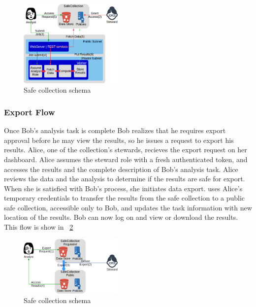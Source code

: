 \begin{figure}
  \center
  \includegraphics[width=0.45\textwidth]{figures/safe_flow.png}
  \caption{Safe collection schema}
  \label{fig:flow1}
  \vspace{-1.5em}
\end{figure}


\subsubsection{Export Flow}

Once Bob's analysis task is complete Bob realizes that he requires export approval before he may view the
results, so he issues a request to export his results. Alice, one of the collection's stewards, recieves
the export request on her dashboard. Alice assumes
the steward role with a fresh authenticated token, and accesses the results and the complete description
of Bob's analysis task. Alice reviews the data and the analysis to determine if the results are
safe for export. When she is satisfied with Bob's process, she initiates data export. \NAME
uses Alice's temporary credentials to transfer the results from the safe collection to a public
safe collection, accessible only to Bob, and updates the task information with new location of the results. Bob can now log on
and view or download the results. This flow is show in \figurename~\ref{fig:flow2}

\begin{figure}
  \center
  \includegraphics[width=0.45\textwidth]{figures/export_flow.png}
  \caption{Safe collection schema}
  \label{fig:flow2}
  \vspace{-1.5em}
\end{figure}


